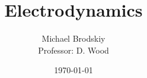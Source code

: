 


\title{Electrodynamics}
\date{\today}
\author{Michael Brodskiy\\ \small Professor: D. Wood}



\maketitle

